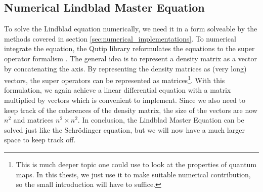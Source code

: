 

\subsection{Numerical Lindblad Master Equation}
To solve the Lindblad equation numerically, we need it in a form solveable by the methods covered in section \ref{sec:numerical_implementations}. To numerical integrate the equation, the Qutip library reformulates the equations to the super operator formalism \cite{johansson_qutip_2012}. The general idea is to represent a density matrix as a vector by concatenating the axis. By representing the density matrices as (very long) vectors, the super operators can be represented as matrices\footnote{This is much deeper topic one could use to look at the properties of quantum maps. In this thesis, we just use it to make suitable numerical contribution, so the small introduction will have to suffice. }. With this formulation, we again achieve a linear differential equation with a matrix multiplied by vectors which is convenient to implement. Since we also need to keep track of the coherences of the density matrix, the size of the vectors are now $n^2$ and matrices $n^2\times n^2$. In conclusion, the Lindblad Master Equation can be solved just like the Schrödinger equation, but we will now have a much larger space to keep track off. 

